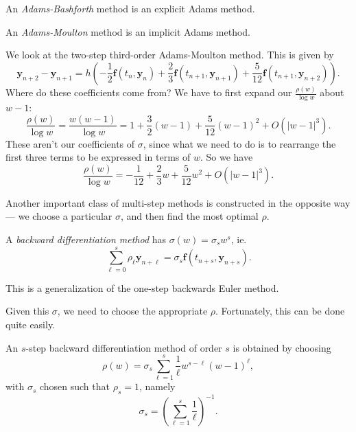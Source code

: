 \documentclass[a4paper]{article}
\begin{document}
\begin{defi}
  An \emph{Adams-Bashforth} method is an explicit Adams method.
\end{defi}

\begin{defi}
  An \emph{Adams-Moulton} method is an implicit Adams method.
\end{defi}

\begin{eg}
  We look at the two-step third-order Adams-Moulton method. This is given by
  \[
    \mathbf{y}_{n + 2} - \mathbf{y}_{n + 1} = h \left(-\frac{1}{2} \mathbf{f}(t_n, \mathbf{y}_n) + \frac{2}{3} \mathbf{f}(t_{n + 1}, \mathbf{y}_{n + 1}) + \frac{5}{12} \mathbf{f}(t_{n + 1}, \mathbf{y}_{n + 2})\right).
  \]
  Where do these coefficients come from? We have to first expand our $\frac{\rho(w)}{\log w}$ about $w - 1$:
  \[
    \frac{\rho(w)}{\log w} = \frac{w(w - 1)}{\log w} = 1 + \frac{3}{2} (w - 1) + \frac{5}{12}(w - 1)^2 + O(|w - 1|^3).
  \]
  These aren't our coefficients of $\sigma$, since what we need to do is to rearrange the first three terms to be expressed in terms of $w$. So we have
  \[
    \frac{\rho(w)}{\log w} = -\frac{1}{12} + \frac{2}{3} w + \frac{5}{12}w^2 + O(|w - 1|^3).
  \]
\end{eg}

Another important class of multi-step methods is constructed in the opposite way --- we choose a particular $\sigma$, and then find the most optimal $\rho$.

\begin{defi}
  A \emph{backward differentiation method} has $\sigma (w) = \sigma_s w^s$, ie.
  \[
    \sum_{\ell = 0}^s \rho_\ell \mathbf{y}_{n + \ell} = \sigma_s \mathbf{f}(t_{n + s}, \mathbf{y}_{n + s}).
  \]
\end{defi}
This is a generalization of the one-step backwards Euler method.

Given this $\sigma$, we need to choose the appropriate $\rho$. Fortunately, this can be done quite easily.
\begin{lemma}
  An $s$-step backward differentiation method of order $s$ is obtained by choosing
  \[
    \rho(w) = \sigma_s \sum_{\ell = 1}^s \frac{1}{\ell} w^{s - \ell}(w - 1)^\ell,
  \]
  with $\sigma_s$ chosen such that $\rho_s = 1$, namely
  \[
    \sigma_s = \left(\sum_{\ell = 1}^s \frac{1}{\ell}\right)^{-1}.
  \]
\end{lemma}
\end{document}
